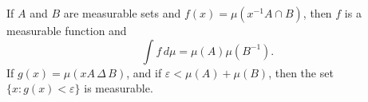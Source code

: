 If $A$ and $B$ are measurable sets and $f(x) = \mu(x^{-1}A \cap B)$, then $f$ is a measurable function and
$$\int f \, d\mu = \mu(A)\mu(B^{-1}).$$
If $g(x) = \mu(xA \,\Delta\, B)$, and if $\varepsilon < \mu(A) + \mu(B)$, then the set $\{x : g(x) < \varepsilon\}$ is measurable.
